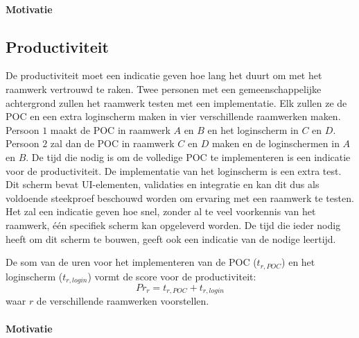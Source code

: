 \paragraph{Motivatie}


\subsection{Productiviteit}
\label{sec:vergelijking-productiviteit}
De productiviteit moet een indicatie geven hoe lang het duurt om met het raamwerk vertrouwd te raken. 
Twee personen met een gemeenschappelijke achtergrond zullen het raamwerk testen met een implementatie.
Elk zullen ze de POC en een extra loginscherm maken in vier verschillende raamwerken maken.
Persoon $1$ maakt de POC in raamwerk $A$ en $B$ en het loginscherm in $C$ en $D$.
Persoon $2$ zal dan de POC in raamwerk $C$ en $D$ maken en de loginschermen in $A$ en $B$.
De tijd die nodig is om de volledige POC te implementeren is een indicatie voor de productiviteit. 
De implementatie van het loginscherm is een extra test.
Dit scherm bevat UI-elementen, validaties en  integratie en kan dit dus als voldoende steekproef beschouwd worden om ervaring met een raamwerk te testen.
Het zal een indicatie geven hoe snel,  zonder al te veel voorkennis van het raamwerk,  één specifiek scherm kan opgeleverd worden.
De tijd die ieder nodig heeft om dit scherm te bouwen, geeft ook een indicatie van de nodige leertijd.


De som van de uren voor het implementeren van de POC ($t_{r,POC}$) en het loginscherm ($t_{r,login}$) vormt de score voor de productiviteit:
\begin{equation}
  Pr_r = {t_{r,POC} + t_{r,login}}
  \label{eq:productiviteit}
\end{equation}
waar $r$ de verschillende raamwerken voorstellen.

\paragraph{Motivatie}

